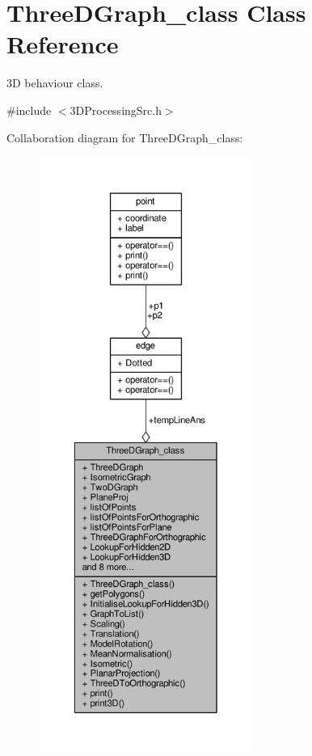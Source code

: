 \hypertarget{classThreeDGraph__class}{}\section{Three\+D\+Graph\+\_\+class Class Reference}
\label{classThreeDGraph__class}


3D behaviour class.  




{\ttfamily \#include $<$3\+D\+Processing\+Src.\+h$>$}



Collaboration diagram for Three\+D\+Graph\+\_\+class\+:
\nopagebreak
\begin{figure}[H]
\begin{center}
\leavevmode
\includegraphics[height=550pt]{classThreeDGraph__class__coll__graph}
\end{center}
\end{figure}
